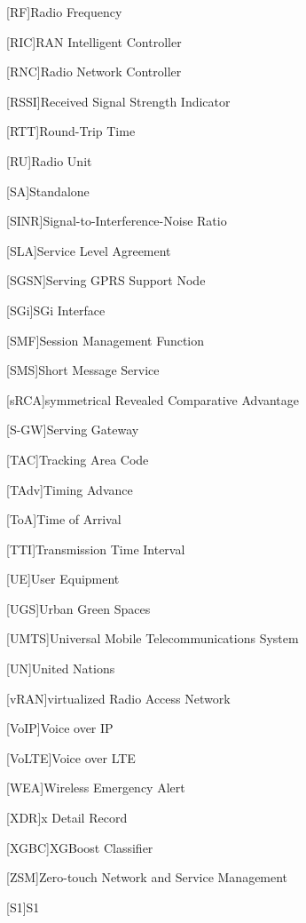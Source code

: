\begin{acronym}[]
[RF]{Radio Frequency}

[RIC]{RAN Intelligent Controller}

[RNC]{Radio Network Controller}  

[RSSI]{Received Signal Strength Indicator}

[RTT]{Round-Trip Time}

[RU]{Radio Unit}  

[SA]{Standalone}

[SINR]{Signal-to-Interference-Noise Ratio}  

[SLA]{Service Level Agreement}

[SGSN]{Serving GPRS Support Node}  

[SGi]{SGi Interface}  

[SMF]{Session Management Function}

[SMS]{Short Message Service}



[sRCA]{symmetrical Revealed Comparative Advantage}

[S-GW]{Serving Gateway}  


[TAC]{Tracking Area Code}

[TAdv]{Timing Advance}

[ToA]{Time of Arrival}

[TTI]{Transmission Time Interval}

[UE]{User Equipment}

[UGS]{Urban Green Spaces}


[UMTS]{Universal Mobile Telecommunications System}  

[UN]{United Nations}


[vRAN]{virtualized Radio Access Network}

[VoIP]{Voice over IP}

[VoLTE]{Voice over LTE}

[WEA]{Wireless Emergency Alert}

[XDR]{x Detail Record}

[XGBC]{XGBoost Classifier}

[ZSM]{Zero-touch Network and Service Management}

[S1]{S1}

\end{acronym}

